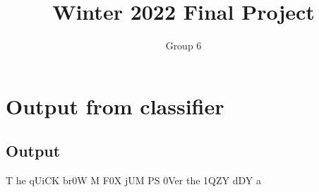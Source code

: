 \documentclass[11pt]{article}
\title{Winter 2022 Final Project}
\author{Group 6}
\begin{document}
\maketitle
\tableofcontents\newpage\newpage
\section{Output from classifier}
\label{section1}
\subsection{Output}
\label{Sec1_L2_Introduction}
T he qUiCK br0W M F0X \newline jUM PS 0Ver the 1QZY dDY \newline a
\end{document}
